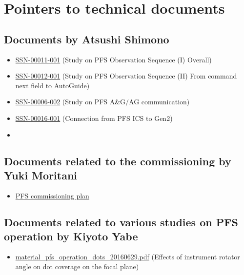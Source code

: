 \documentclass[a4paper]{article}
\begin{document}
\clearpage
\appendix
\section{Pointers to technical documents}

\subsection{Documents by Atsushi Shimono \label{appendix:documents:shimono}}
\begin{itemize}
\item \href{http://sumire.pbworks.com/w/file/102897967/SSN-00011-001-ICSSeq-1-Overall.pptx}{SSN-00011-001} (Study on PFS Observation Sequence (I) Overall)
\item \href{http://sumire.pbworks.com/w/file/94687160/SSN-00012-001-ICSSeq-2-CommandToAG.pptx}{SSN-00012-001} (Study on PFS Observation Sequence (II) From command next field to AutoGuide)
\item \href{http://sumire.pbworks.com/w/file/93138234/SSN-00006-001-AGtoGen2.pptx}{SSN-00006-002} (Study on PFS A\&G/AG communication)
\item \href{http://sumire.pbworks.com/w/file/101124121/SSN-00016-001-Gen2-OBCP.pptx}{SSN-00016-001} (Connection from PFS ICS to Gen2)
\item 
\end{itemize}

\subsection{Documents related to the commissioning by Yuki Moritani\label{appendix:documents:moritani}}
\begin{itemize}
\item \href{}{PFS commissioning plan}
\end{itemize}

\subsection{Documents related to various studies on PFS operation by Kiyoto Yabe\label{appendix:documents:yabe}}
\begin{itemize}
\item \href{http://member.ipmu.jp/kiyoto.yabe/PFS/tmp/material_pfs_operation_dots_20160629.pdf}{material\_pfs\_operation\_dots\_20160629.pdf} (Effects of instrument rotator angle on dot coverage on the focal plane)
\end{itemize}
\end{document}
